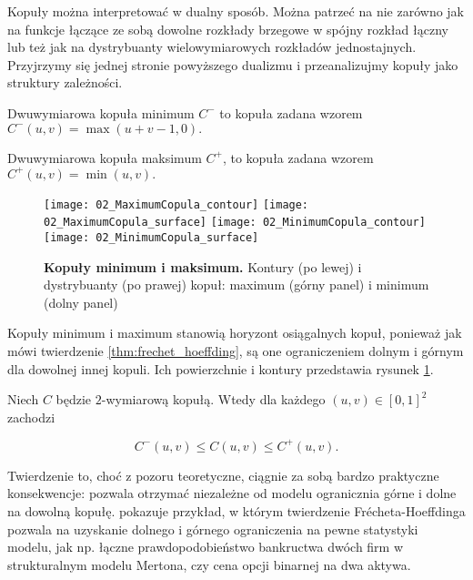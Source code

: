 Kopuły można interpretować w dualny sposób. Można patrzeć na nie zarówno jak na funkcje łączące ze sobą dowolne rozkłady brzegowe w spójny rozkład łączny lub też jak na dystrybuanty wielowymiarowych rozkładów jednostajnych. Przyjrzymy się jednej stronie powyższego dualizmu i przeanalizujmy kopuły jako struktury zależności.

\begin{df}
	Dwuwymiarowa kopuła minimum $C^{-}$ to kopuła zadana wzorem $C^{-}(u, v) = \max(u+v-1, 0).$
\end{df}
\begin{df}
	Dwuwymiarowa kopuła maksimum $C^{+}$, to kopuła zadana wzorem $C^{+}(u, v) = \min(u, v).$
\end{df}

\begin{figure}[h]
	\centering
	\texttt{[image: 02\_MaximumCopula\_contour]}
	\texttt{[image: 02\_MaximumCopula\_surface]}
	\texttt{[image: 02\_MinimumCopula\_contour]}
	\texttt{[image: 02\_MinimumCopula\_surface]}
	
	\caption{\textbf{Kopuły minimum i maksimum.} Kontury (po lewej) i dystrybuanty (po prawej) kopuł: maximum (górny panel) i minimum (dolny panel)\label{fig:minmax_copula}}
\end{figure}

Kopuły minimum i maximum stanowią horyzont osiągalnych kopuł, ponieważ jak mówi twierdzenie \ref{thm:frechet_hoeffding}, są one ograniczeniem dolnym i górnym dla dowolnej innej kopuli. Ich powierzchnie i kontury przedstawia rysunek \ref{fig:minmax_copula}. 

\begin{thm}
	Niech $C$ będzie $2$-wymiarową kopułą. Wtedy dla każdego $(u, v)\in[0, 1]^2$ zachodzi
	
	$$ C^{-}(u, v) \leqslant C(u, v) \leqslant C^{+}(u, v).$$
	
	\label{thm:frechet_hoeffding}
\end{thm}

Twierdzenie to, choć z pozoru teoretyczne, ciągnie za sobą bardzo praktyczne konsekwencje: pozwala otrzymać niezależne od modelu ogranicznia górne i dolne na dowolną kopułę. \cite{Cherubini_Copula_Methods_in_Finance} pokazuje przykład, w którym twierdzenie \newline Frécheta-Hoeffdinga pozwala na uzyskanie dolnego i górnego ograniczenia na pewne statystyki modelu, jak np. łączne prawdopodobieństwo bankructwa dwóch firm w strukturalnym modelu Mertona, czy cena opcji binarnej na dwa aktywa.\\

